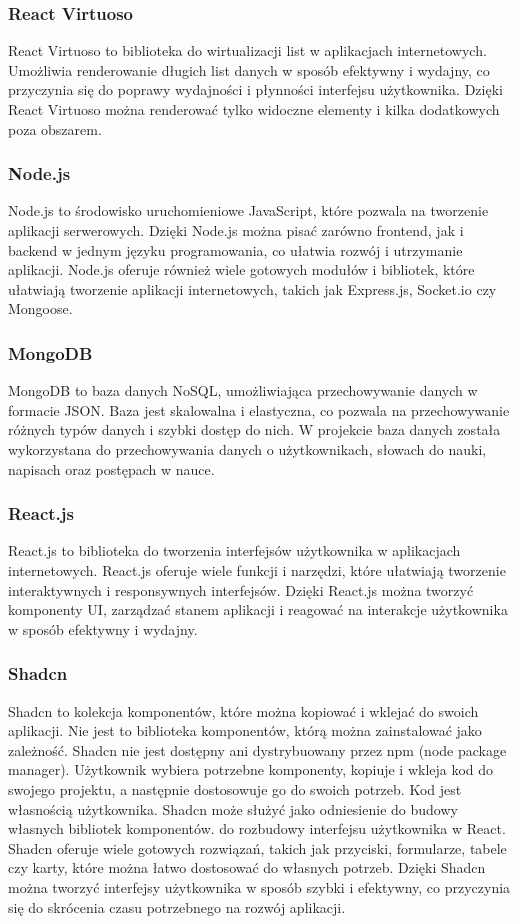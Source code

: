 \subsubsection{React Virtuoso}
React Virtuoso to biblioteka do wirtualizacji list w aplikacjach internetowych. Umożliwia renderowanie długich list danych w sposób efektywny i wydajny, co przyczynia się do poprawy wydajności i płynności interfejsu użytkownika. Dzięki React Virtuoso można renderować tylko widoczne elementy i kilka dodatkowych poza obszarem.

\subsubsection{Node.js}
Node.js to środowisko uruchomieniowe JavaScript, które pozwala na tworzenie aplikacji serwerowych. Dzięki Node.js można pisać zarówno frontend, jak i backend w jednym języku programowania, co ułatwia rozwój i utrzymanie aplikacji. Node.js oferuje również wiele gotowych modułów i bibliotek, które ułatwiają tworzenie aplikacji internetowych, takich jak Express.js, Socket.io czy Mongoose.

\subsubsection{MongoDB}
MongoDB to baza danych NoSQL, umożliwiająca przechowywanie danych w formacie JSON. Baza jest skalowalna i elastyczna, co pozwala na przechowywanie różnych typów danych i szybki dostęp do nich. W projekcie baza danych została wykorzystana do przechowywania danych o użytkownikach, słowach do nauki, napisach oraz postępach w nauce.

\subsubsection{React.js}
React.js to biblioteka do tworzenia interfejsów użytkownika w aplikacjach internetowych. React.js oferuje wiele funkcji i narzędzi, które ułatwiają tworzenie interaktywnych i responsywnych interfejsów. Dzięki React.js można tworzyć komponenty UI, zarządzać stanem aplikacji i reagować na interakcje użytkownika w sposób efektywny i wydajny.

\subsubsection{Shadcn}
Shadcn to kolekcja komponentów, które można kopiować i wklejać do swoich aplikacji. Nie jest to biblioteka komponentów, którą można zainstalować jako zależność. Shadcn nie jest dostępny ani dystrybuowany przez npm (node package manager). Użytkownik wybiera potrzebne komponenty, kopiuje i wkleja kod do swojego projektu, a następnie dostosowuje go do swoich potrzeb. Kod jest własnością użytkownika. Shadcn może służyć jako odniesienie do budowy własnych bibliotek komponentów. do rozbudowy interfejsu użytkownika w React. Shadcn oferuje wiele gotowych rozwiązań, takich jak przyciski, formularze, tabele czy karty, które można łatwo dostosować do własnych potrzeb. Dzięki Shadcn można tworzyć interfejsy użytkownika w sposób szybki i efektywny, co przyczynia się do skrócenia czasu potrzebnego na rozwój aplikacji.




